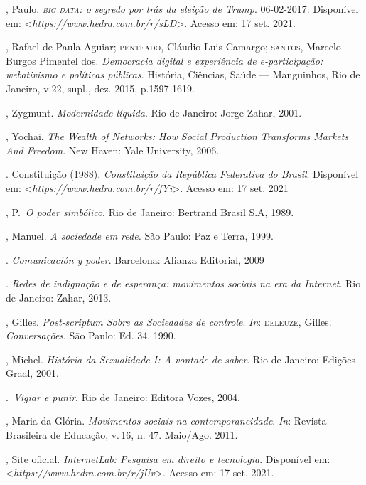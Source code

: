 \begin{bibliohedra}
, Paulo. \emph{\textsc{big data}: o segredo por trás da eleição de Trump}.
06-02-2017. Disponível em: \textless{}\emph{https://www.hedra.com.br/r/sLD}\textgreater{}. Acesso em: 17 set. 2021.

, Rafael de Paula Aguiar; \textsc{penteado}, Cláudio Luis Camargo; \textsc{santos},
Marcelo Burgos Pimentel dos. \emph{Democracia digital e experiência de
e-participação: webativismo e políticas públicas}. História, Ciências,
Saúde --- Manguinhos, Rio de Janeiro, v.22, supl., dez. 2015,
p.1597-1619.

, Zygmunt. \emph{Modernidade líquida}. Rio de Janeiro: Jorge Zahar, 2001.

, Yochai. \emph{The Wealth of Networks: How Social Production
Transforms Markets And Freedom}. New Haven: Yale University, 2006.

. Constituição (1988). \emph{Constituição da República
Federativa do Brasil}. Disponível em: \textless{}\emph{https://www.hedra.com.br/r/fYi}\textgreater{}. Acesso em: 17 set. 2021

, P.~\emph{O poder simbólico}. Rio de Janeiro: Bertrand Brasil
S.A, 1989.

, Manuel. \emph{A sociedade em rede.} São Paulo: Paz e Terra,
1999.

\titidem. \emph{Comunicación y poder}. Barcelona: Alianza
Editorial, 2009

\titidem. \emph{Redes de indignação e de esperança:
movimentos sociais na era da Internet}. Rio de Janeiro: Zahar, 2013.

, Gilles. \emph{Post-scriptum Sobre as Sociedades de controle}. \emph{In}: \textsc{deleuze}, Gilles. \emph{Conversações}. São Paulo: Ed. 34, 1990.

, Michel. \emph{História da Sexualidade I: A vontade de
saber}. Rio de Janeiro: Edições Graal, 2001.

\titidem.~\emph{Vigiar e punir}. Rio de Janeiro: Editora Vozes, 2004.

, Maria da Glória. \emph{Movimentos sociais na contemporaneidade}.
\emph{In}: Revista Brasileira de Educação, v.\,16, n. 47. Maio/Ago. 2011.

, Site oficial. \emph{InternetLab: Pesquisa em direito e
tecnologia}. Disponível em: \textless{}\emph{https://www.hedra.com.br/r/jUv}\textgreater{}. Acesso em: 17 set. 2021.


\end{bibliohedra}
